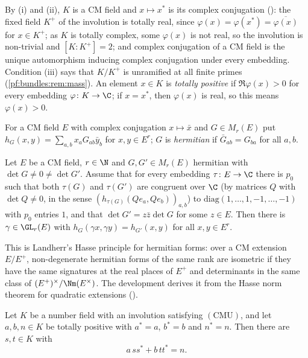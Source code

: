 By (i) and (ii), $K$ is a CM field and $x\mapsto x^*$ is its complex conjugation
(): the fixed field $K^+$ of the involution is totally
real, since $\varphi(x)=\varphi(x^*)=\overline{\varphi(x)}$ for $x\in K^+$; as $K$ is totally complex, some
$\varphi(x)$ is not real, so the involution is non-trivial and $[K:K^+]=2$; and complex conjugation of a CM
field is the unique automorphism inducing complex conjugation under every embedding. Condition (iii) says that
$K/K^+$ is unramified at all finite primes (\cref{pf:bundles:rem:mass}). An element $x\in K$ is
\emph{totally positive} if $\Re\varphi(x)>0$ for every embedding $\varphi\colon K\to\C$; if $x=x^*$, then
$\varphi(x)$ is real, so this means $\varphi(x)>0$.

For a CM field $E$ with complex conjugation $x\mapsto\bar x$ and $G\in M_r(E)$ put
$h_G(x,y)=\sum_{a,b}x_aG_{ab}\bar y_b$ for $x,y\in E^r$; $G$ is \emph{hermitian} if $\bar G_{ab}=G_{ba}$ for all
$a,b$.

\begin{littheorem}\label{pf:sh-flag:landherr}
Let $E$ be a CM field, $r\in\N$ and $G,G'\in M_r(E)$ hermitian with $\det G\ne0\ne\det G'$. Assume that for every
embedding $\tau\colon E\to\C$ there is $p_0$ such that both $\tau(G)$ and $\tau(G')$ are congruent over $\C$
(by matrices $Q$ with $\det Q\ne0$, in the sense $(h_{\tau(G)}(Qe_a,Qe_b))_{a,b}$) to
$\mathrm{diag}(1,\dots,1,-1,\dots,-1)$ with $p_0$ entries $1$, and that $\det G'=z\bar z\det G$ for some $z\in E$.
Then there is $\gamma\in\GL_r(E)$ with $h_G(\gamma x,\gamma y)=h_{G'}(x,y)$ for all $x,y\in E^r$.
\end{littheorem}

This is Landherr's Hasse principle for hermitian forms: over a CM extension $E/E^+$, non-degenerate
hermitian forms of the same rank are isometric if they have the same signatures at the real places of $E^+$
and determinants in the same class of $(E^+)^\times/\Nm(E^\times)$. The development derives it from the Hasse
norm theorem for quadratic extensions ().

\begin{proposition}\label{pf:sh-flag:hermrep}
Let $K$ be a number field with an involution satisfying $(\mathrm{CMU})$, and let $a,b,n\in K$ be totally
positive with $a^*=a$, $b^*=b$ and $n^*=n$. Then there are $s,t\in K$ with
\[
a\,ss^*+b\,tt^*=n .
\]
\end{proposition}

